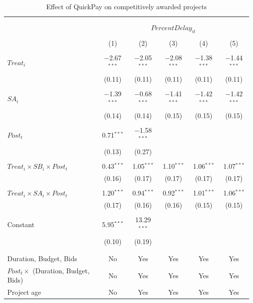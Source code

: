 \documentclass[
]{article}
\begin{document}
\begin{table}[H] \centering 
  \caption{Effect of QuickPay on competitively awarded projects} 
  \label{} 
\small 
\begin{tabular}{@{\extracolsep{-2pt}}lccccc} 
\\[-1.8ex]\hline 
\hline \\[-1.8ex] 
\\[-1.8ex] & \multicolumn{5}{c}{$PercentDelay_{it}$  } \\ 
\\[-1.8ex] & (1) & (2) & (3) & (4) & (5)\\ 
\hline \\[-1.8ex] 
 $Treat_i$ & $-$2.67$^{***}$ & $-$2.05$^{***}$ & $-$2.08$^{***}$ & $-$1.38$^{***}$ & $-$1.44$^{***}$ \\ 
  & (0.11) & (0.11) & (0.11) & (0.11) & (0.11) \\ 
  & & & & & \\ 
 $SA_i$ & $-$1.39$^{***}$ & $-$0.68$^{***}$ & $-$1.41$^{***}$ & $-$1.42$^{***}$ & $-$1.42$^{***}$ \\ 
  & (0.14) & (0.14) & (0.15) & (0.15) & (0.15) \\ 
  & & & & & \\ 
 $Post_t$ & 0.71$^{***}$ & $-$1.58$^{***}$ &  &  &  \\ 
  & (0.13) & (0.27) &  &  &  \\ 
  & & & & & \\ 
 $Treat_i \times SB_i \times Post_t$ & 0.43$^{***}$ & 1.05$^{***}$ & 1.10$^{***}$ & 1.06$^{***}$ & 1.07$^{***}$ \\ 
  & (0.16) & (0.17) & (0.17) & (0.17) & (0.17) \\ 
  & & & & & \\ 
 $Treat_i \times SA_i \times Post_t$ & 1.20$^{***}$ & 0.94$^{***}$ & 0.92$^{***}$ & 1.01$^{***}$ & 1.06$^{***}$ \\ 
  & (0.17) & (0.16) & (0.16) & (0.15) & (0.15) \\ 
  & & & & & \\ 
 Constant & 5.95$^{***}$ & 13.29$^{***}$ &  &  &  \\ 
  & (0.10) & (0.19) &  &  &  \\ 
  & & & & & \\ 
\hline \\[-1.8ex] 
Duration, Budget, Bids & No & Yes & Yes & Yes & Yes \\ 
$Post_t \times $  (Duration, Budget, Bids) & No & Yes & Yes & Yes & Yes \\ 
Project age & No & Yes & Yes & Yes & Yes \\ 

\end{tabular}
\end{table}
\end{document}
